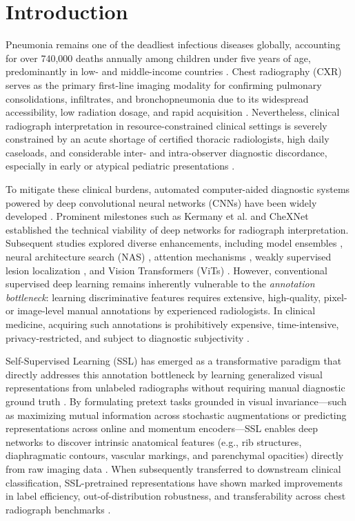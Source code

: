 \documentclass[journal,article,submit,moreauthors,pdftex]{Definitions/tsp}
\begin{document}
\section{Introduction} \label{sect:s1}

Pneumonia remains one of the deadliest infectious diseases globally, accounting for over 740,000 deaths annually among children under five years of age, predominantly in low- and middle-income countries \cite{WHO2022,Kermany18}. Chest radiography (CXR) serves as the primary first-line imaging modality for confirming pulmonary consolidations, infiltrates, and bronchopneumonia due to its widespread accessibility, low radiation dosage, and rapid acquisition \cite{Rajpurkar17}. Nevertheless, clinical radiograph interpretation in resource-constrained clinical settings is severely constrained by an acute shortage of certified thoracic radiologists, high daily caseloads, and considerable inter- and intra-observer diagnostic discordance, especially in early or atypical pediatric presentations \cite{Sowrirajan21,Huang23}.

To mitigate these clinical burdens, automated computer-aided diagnostic systems powered by deep convolutional neural networks (CNNs) have been widely developed \cite{ElAsnaoui21,Kundu21}. Prominent milestones such as Kermany et al. \cite{Kermany18} and CheXNet \cite{Rajpurkar17} established the technical viability of deep networks for radiograph interpretation. Subsequent studies explored diverse enhancements, including model ensembles \cite{Kundu21,Mabrouk22}, neural architecture search (NAS) \cite{Gupta22}, attention mechanisms \cite{Singh23,Asswin23}, weakly supervised lesion localization \cite{Guo23}, and Vision Transformers (ViTs) \cite{Singh24,Ha23}. However, conventional supervised deep learning remains inherently vulnerable to the \emph{annotation bottleneck}: learning discriminative features requires extensive, high-quality, pixel- or image-level manual annotations by experienced radiologists. In clinical medicine, acquiring such annotations is prohibitively expensive, time-intensive, privacy-restricted, and subject to diagnostic subjectivity \cite{Huang23,Azizi21}.

Self-Supervised Learning (SSL) has emerged as a transformative paradigm that directly addresses this annotation bottleneck by learning generalized visual representations from unlabeled radiographs without requiring manual diagnostic ground truth \cite{Chen20,He20,Tiu22}. By formulating pretext tasks grounded in visual invariance---such as maximizing mutual information across stochastic augmentations or predicting representations across online and momentum encoders---SSL enables deep networks to discover intrinsic anatomical features (e.g., rib structures, diaphragmatic contours, vascular markings, and parenchymal opacities) directly from raw imaging data \cite{Grill20,Caron21}. When subsequently transferred to downstream clinical classification, SSL-pretrained representations have shown marked improvements in label efficiency, out-of-distribution robustness, and transferability across chest radiograph benchmarks \cite{Sowrirajan21,Tiu22,Cho23}.
\end{document}
